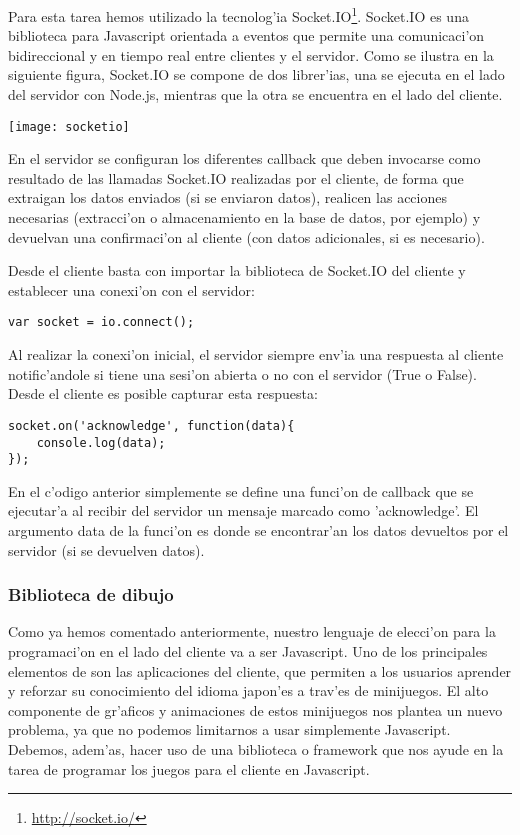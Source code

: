 Para esta tarea hemos utilizado la tecnolog'ia Socket.IO\footnote{\url{http://socket.io/}}. Socket.IO es una 
biblioteca para Javascript orientada a eventos que permite una comunicaci'on bidireccional y en tiempo real 
entre clientes y el servidor. Como se ilustra en la siguiente figura, Socket.IO se compone de dos librer'ias, una se 
ejecuta en el lado del servidor con Node.js, mientras que la otra se encuentra en el lado del cliente.

\begin{center}
\texttt{[image: socketio]}
\end{center}

En el servidor se configuran los diferentes callback que deben invocarse como resultado de las llamadas Socket.IO
realizadas por el cliente, de forma que extraigan los datos enviados (si se enviaron datos), realicen las acciones
necesarias (extracci'on o almacenamiento en la base de datos, por ejemplo) y devuelvan una confirmaci'on al cliente
(con datos adicionales, si es necesario).

Desde el cliente basta con importar la biblioteca de Socket.IO del cliente y establecer una conexi'on con el servidor:

\begin{verbatim}
var socket = io.connect();
\end{verbatim}

Al realizar la conexi'on inicial, el servidor siempre env'ia una respuesta al cliente notific'andole si tiene una
sesi'on abierta o no con el servidor (True o False). Desde el cliente es posible capturar esta respuesta:

\begin{verbatim}
socket.on('acknowledge', function(data){
    console.log(data);
});
\end{verbatim}

En el c'odigo anterior simplemente se define una funci'on de callback que se ejecutar'a al recibir del servidor un
mensaje marcado como 'acknowledge'. El argumento data de la funci'on es donde se encontrar'an los datos devueltos
por el servidor (si se devuelven datos).

\subsubsection{Biblioteca de dibujo}
\label{sub:biblioteca_de_dibujo}

Como ya hemos comentado anteriormente, nuestro lenguaje de elecci'on para la programaci'on en el
lado del cliente va a ser Javascript. 
Uno de los principales elementos de \Nipponline{} son las aplicaciones del cliente, que permiten a
los usuarios aprender y reforzar su conocimiento del idioma japon'es a trav'es de minijuegos. El
alto componente de gr'aficos y animaciones de estos minijuegos nos plantea un nuevo problema, ya
que no podemos limitarnos a usar simplemente Javascript. Debemos, adem'as, hacer uso de una
biblioteca o framework que nos ayude en la tarea de programar los juegos para el cliente en
Javascript.

